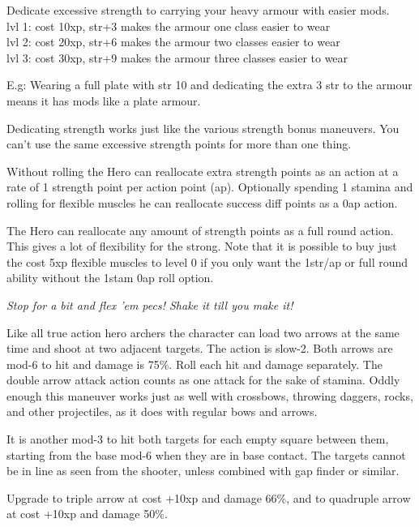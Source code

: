 Dedicate excessive strength to carrying your heavy armour with easier mods.\\
lvl 1: cost 10xp, str+3 makes the armour one class easier to wear\\
lvl 2: cost 20xp, str+6 makes the armour two classes easier to wear\\
lvl 3: cost 30xp, str+9 makes the armour three classes easier to wear

E.g: Wearing a full plate with str 10 and dedicating the extra 3 str to the armour means it has mods like a plate armour.

Dedicating strength works just like the various strength bonus maneuvers. You can't use the same excessive strength points for more than one thing.


Without rolling the Hero can reallocate extra strength points as an action at a rate of 1 strength point per action point (ap). Optionally spending 1 stamina and rolling for flexible muscles he can reallocate success diff points as a 0ap action.

The Hero can reallocate any amount of strength points as a full round action.
This gives a lot of flexibility for the strong. Note that it is possible to buy just the cost 5xp flexible muscles to level 0 if you only want the 1str/ap or full round ability without the 1stam 0ap roll option.

\noindent \textit{Stop for a bit and flex 'em pecs! Shake it till you make it!}


 Like all true action hero archers the character can load two arrows at the same time and shoot at two adjacent targets. The action is slow-2. Both arrows are mod-6 to hit and damage is 75\%. Roll each hit and damage separately. The double arrow attack action counts as one attack for the sake of stamina. 
Oddly enough this maneuver works just as well with crossbows, throwing daggers, rocks, and other projectiles, as it does with regular bows and arrows.

It is another mod-3 to hit both targets for each empty square between them, starting from the base mod-6 when they are in base contact. The targets cannot be in line as seen from the shooter, unless combined with gap finder or similar.

Upgrade to triple arrow at cost +10xp and damage 66\%, and to quadruple arrow at cost +10xp and damage 50\%.


